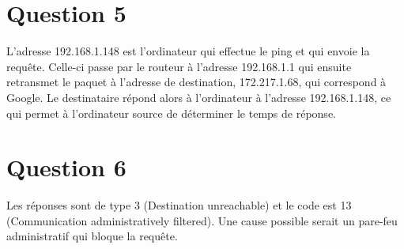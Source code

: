 \section{Question 5}
L'adresse 192.168.1.148 est l'ordinateur qui effectue le ping et qui envoie la requête. Celle-ci passe par le routeur à l'adresse 192.168.1.1 qui ensuite retransmet le paquet à l'adresse de destination, 172.217.1.68, qui correspond à Google. Le destinataire répond alors à l'ordinateur à l'adresse 192.168.1.148, ce qui permet à l'ordinateur source de déterminer le temps de réponse.
\section{Question 6}
Les réponses sont de type 3 (Destination unreachable) et le code est 13 (Communication administratively filtered).
Une cause possible serait un pare-feu administratif qui bloque la requête.
